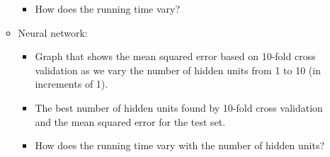 \documentclass{article}
\begin{document}
\begin{enumerate}
\begin{itemize}
\begin{itemize}
\item How does the running time vary?
\end{itemize}
\item Neural network:
\begin{itemize}
    \item Graph that shows the mean squared error based on 10-fold cross validation as we vary the number of hidden units from 1 to 10 (in increments of 1).
    \item The best number of hidden units found by 10-fold cross validation and the mean squared error for the test set.
    \item How does the running time vary with the number of hidden units?
\end{itemize}
\end{itemize}

\end{enumerate}
\end{document}

